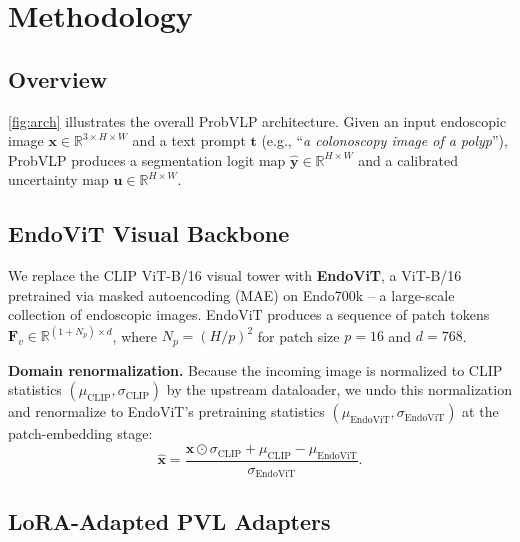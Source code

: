 
\section{Methodology}
\label{sec:method}

\subsection{Overview}
\label{subsec:overview}

\cref{fig:arch} illustrates the overall ProbVLP architecture. Given an input
endoscopic image $\bm{x} \in \mathbb{R}^{3 \times H \times W}$ and a text prompt
$\bm{t}$ (e.g., ``\textit{a colonoscopy image of a polyp}''), ProbVLP produces
a segmentation logit map $\hat{\bm{y}} \in \mathbb{R}^{H \times W}$ and a
calibrated uncertainty map $\bm{u} \in \mathbb{R}^{H \times W}$.

\subsection{EndoViT Visual Backbone}
\label{subsec:endovit}

We replace the CLIP ViT-B/16 visual tower with \textbf{EndoViT}, a ViT-B/16
pretrained via masked autoencoding (MAE) on Endo700k -- a large-scale collection
of endoscopic images. EndoViT produces a sequence of patch tokens
$\bm{F}_v \in \mathbb{R}^{(1+N_p) \times d}$, where $N_p = (H/p)^2$ for patch
size $p{=}16$ and $d{=}768$.

\textbf{Domain renormalization.} Because the incoming image is normalized to CLIP
statistics $(\mu_\text{CLIP}, \sigma_\text{CLIP})$ by the upstream dataloader, we
undo this normalization and renormalize to EndoViT's pretraining statistics
$(\mu_\text{EndoViT}, \sigma_\text{EndoViT})$ at the patch-embedding stage:
\begin{equation}
    \hat{\bm{x}} = \frac{\bm{x} \odot \sigma_\text{CLIP} + \mu_\text{CLIP}
                   - \mu_\text{EndoViT}}{\sigma_\text{EndoViT}}.
\end{equation}

\subsection{LoRA-Adapted PVL Adapters}
\label{subsec:lora}

